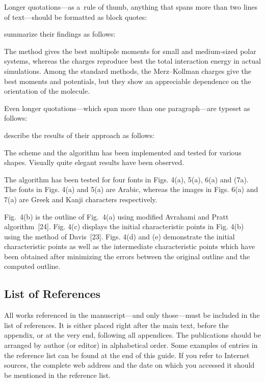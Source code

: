 \documentclass[12pt, a4paper, oneside]{article}
\newlength{\baselinedist}
\newlength{\smalllinespacing}
\renewenvironment{quote}{%
	\par\list{}{%
		\leftmargin = \baselineskip%
		\rightmargin = \leftmargin%
		\baselineskip = \smalllinespacing%
	}
	\item\relax%
}{%
	\endlist%
}
\renewenvironment{quotation}{%
	\list{}{%
		\leftmargin = \baselineskip%
		\rightmargin = \leftmargin%
		\listparindent = \smalllinespacing%
		\parsep = 0pt%
		\baselineskip = \smalllinespacing%
	}%
	\item\relax%
}{%
	\endlist%
}
\renewcommand{\caps}[1]{{\textscale{0.97}{\textls[50]{\MakeUppercase{#1}}}}}
\theoremstyle{Plain}
\theoremstyle{Definition}
\theoremstyle{Remark}
\let \cite \textcite
\begin{document}
Longer quotations---as a~rule of thumb, anything that spans more than two lines of text---should be formatted as block quotes:
\begin{tcolorbox}[bottom = -0.75\baselinedist, breakable = false]
	\cite[377]{sigfridsson} summarize their findings as follows:
	\begin{quote}\vspace{-\smallskipamount}%
		The \caps{CHELMO} method gives the best multipole moments for small and medium-sized polar systems, whereas the \caps{CHELP-BOW} charges reproduce best the total interaction energy in actual simulations. Among the standard methods, the Merz--Kollman charges give the best moments and potentials, but they show an appreciable dependence on the orientation of the molecule.
	\end{quote}
\end{tcolorbox}
Even longer quotations---which span more than one paragraph---are typeset as follows: \begin{tcolorbox}[bottom = -0.75\baselinedist, breakable = false]
	\cite[801]{sarfraz} describe the results of their approach as follows:
	\begin{quotation}\vspace{-\smallskipamount}%
		The scheme and the algorithm has been implemented and tested for various shapes. Visually quite elegant results have been observed. \par
		The algorithm has been tested for four fonts in Figs. 4(a), 5(a), 6(a) and (7a). The fonts in Figs. 4(a) and 5(a) are Arabic, whereas the images in Figs. 6(a) and 7(a) are Greek and Kanji characters respectively. \par
		Fig.~4(b) is the outline of Fig.~4(a) using modified Avrahami and Pratt algorithm~[24]. Fig. 4(c) displays the initial characteristic points in Fig. 4(b) using the method of Davis~[23]. Figs. 4(d) and (e) demonstrate the initial characteristic points as well as the intermediate characteristic points which have been obtained after minimizing the errors between the original outline and the computed outline.
	\end{quotation}
\end{tcolorbox}

\subsection{List of References}

All works referenced in the manuscript---and only those---must be included in the list of references. It is either placed right after the main text, before the appendix, or at the very end, following all appendices. The publications should be arranged by author (or editor) in alphabetical order. Some examples of entries in the reference list can be found at the end of this guide. If you refer to Internet sources, the complete web address and the date on which you accessed it should be mentioned in the reference list.
\end{document}
